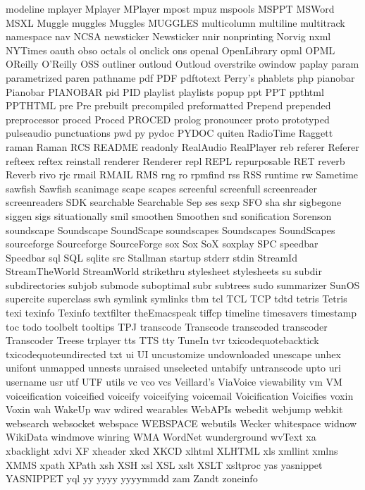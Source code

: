 modeline
mplayer
Mplayer
MPlayer
mpost
mpuz
mspools
MSPPT
MSWord
MSXL
Muggle
muggles
Muggles
MUGGLES
multicolumn
multiline
multitrack
namespace
nav
NCSA
newsticker
Newsticker
nnir
nonprinting
Norvig
nxml
NYTimes
oauth
obso
octals
ol
onclick
ons
openal
OpenLibrary
opml
OPML
OReilly
O'Reilly
OSS
outliner
outloud
Outloud
overstrike
owindow
paplay
param
parametrized
paren
pathname
pdf
PDF
pdftotext
Perry's
phablets
php
pianobar
Pianobar
PIANOBAR
pid
PID
playlist
playlists
popup
ppt
PPT
ppthtml
PPTHTML
pre
Pre
prebuilt
precompiled
preformatted
Prepend
prepended
preprocessor
proced
Proced
PROCED
prolog
pronouncer
proto
prototyped
pulseaudio
punctuations
pwd
py
pydoc
PYDOC
quiten
RadioTime
Raggett
raman
Raman
RCS
README
readonly
RealAudio
RealPlayer
reb
referer
Referer
refteex
reftex
reinstall
renderer
Renderer
repl
REPL
repurposable
RET
reverb
Reverb
rivo
rjc
rmail
RMAIL
RMS
rng
ro
rpmfind
rss
RSS
runtime
rw
Sametime
sawfish
Sawfish
scanimage
scape
scapes
screenful
screenfull
screenreader
screenreaders
SDK
searchable
Searchable
Sep
ses
sexp
SFO
sha
shr
sigbegone
siggen
sigs
situationally
smil
smoothen
Smoothen
snd
sonification
Sorenson
soundscape
Soundscape
SoundScape
soundscapes
Soundscapes
SoundScapes
sourceforge
Sourceforge
SourceForge
sox
Sox
SoX
soxplay
SPC
speedbar
Speedbar
sql
SQL
sqlite
src
Stallman
startup
stderr
stdin
StreamId
StreamTheWorld
StreamWorld
strikethru
stylesheet
stylesheets
su
subdir
subdirectories
subjob
submode
suboptimal
subr
subtrees
sudo
summarizer
SunOS
supercite
superclass
swh
symlink
symlinks
tbm
tcl
TCL
TCP
tdtd
tetris
Tetris
texi
texinfo
Texinfo
textfilter
theEmacspeak
tiffcp
timeline
timesavers
timestamp
toc
todo
toolbelt
tooltips
TPJ
transcode
Transcode
transcoded
transcoder
Transcoder
Treese
trplayer
tts
TTS
tty
TuneIn
tvr
txicodequotebacktick
txicodequoteundirected
txt
ui
UI
uncustomize
undownloaded
unescape
unhex
unifont
unmapped
unnests
unraised
unselected
untabify
untranscode
upto
uri
username
usr
utf
UTF
utils
vc
vco
vcs
Veillard's
ViaVoice
viewability
vm
VM
voiceification
voiceified
voiceify
voiceifying
voicemail
Voicification
Voicifies
voxin
Voxin
wah
WakeUp
wav
wdired
wearables
WebAPIs
webedit
webjump
webkit
websearch
websocket
webspace
WEBSPACE
webutils
Wecker
whitespace
widnow
WikiData
windmove
winring
WMA
WordNet
wunderground
wvText
xa
xbacklight
xdvi
XF
xheader
xkcd
XKCD
xlhtml
XLHTML
xls
xmllint
xmlns
XMMS
xpath
XPath
xsh
XSH
xsl
XSL
xslt
XSLT
xsltproc
yas
yasnippet
YASNIPPET
yql
yy
yyyy
yyyymmdd
zam
Zandt
zoneinfo
